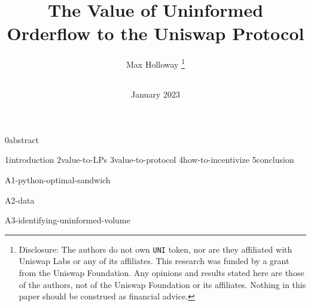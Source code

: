 \documentclass{article}
\title{The Value of Uninformed Orderflow to the Uniswap Protocol}
\author{
    Max Holloway \footnote{Disclosure: The authors do not own \texttt{UNI} token, nor are they affiliated with Uniswap Labs or any of its affiliates. This research was funded by a grant from the Uniswap Foundation. Any opinions and results stated here are those of the authors, not of the Uniswap Foundation or its affiliates. Nothing in this paper should be construed as financial advice.} \\
    \texttt{
        \href{mailto:max@xenophonlabs.com}{\color{black}{max@xenophonlabs.com}}
    } 
}
\date{January 2023}
\begin{document}
    \maketitle    
    {0abstract}
    \tableofcontents
    \newpage
    
    {1introduction}
    {2value-to-LPs}
    {3value-to-protocol}
    {4how-to-incentivize}
    {5conclusion}
    
    \appendix
    \newpage
    {A1-python-optimal-sandwich}
    
    \newpage
    {A2-data}
    
    \newpage
    {A3-identifying-uninformed-volume}

    \newpage
    \printbibliography
    
\end{document}

